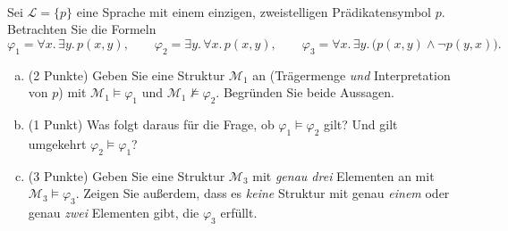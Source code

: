 \\
Sei $\mathscr{L}=\{p\}$ eine Sprache mit einem einzigen, zweistelligen Prädikatensymbol $p$. Betrachten Sie die Formeln
\[
  \varphi_1 = \forall x.\,\exists y.\, p(x,y),
  \qquad
  \varphi_2 = \exists y.\,\forall x.\, p(x,y),
  \qquad
  \varphi_3 = \forall x.\,\exists y.\,\big(p(x,y) \wedge \neg p(y,x)\big).
\]
\begin{enumerate}[a)]
  \item (2 Punkte) Geben Sie eine Struktur $\mathcal{M}_1$ an (Trägermenge \emph{und} Interpretation von $p$) mit
  $\mathcal{M}_1\models\varphi_1$ und $\mathcal{M}_1\not\models\varphi_2$. Begründen Sie beide Aussagen.
  \item (1 Punkt) Was folgt daraus für die Frage, ob $\varphi_1\models\varphi_2$ gilt? Und gilt umgekehrt $\varphi_2\models\varphi_1$?
  \item (3 Punkte) Geben Sie eine Struktur $\mathcal{M}_3$ mit \emph{genau drei} Elementen an mit $\mathcal{M}_3\models\varphi_3$. Zeigen Sie außerdem, dass es \emph{keine} Struktur mit genau \emph{einem} oder genau \emph{zwei} Elementen gibt, die $\varphi_3$ erfüllt.
\end{enumerate}

